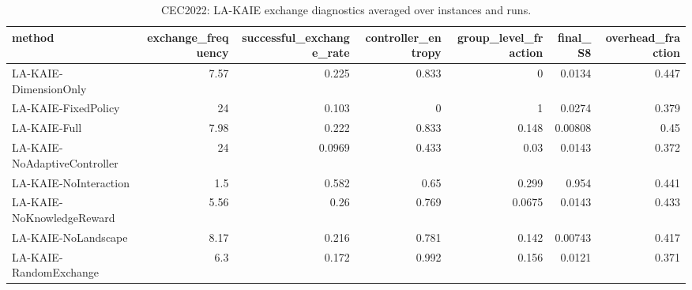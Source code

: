 \begin{table}[t]
\centering
\scriptsize
\caption{CEC2022: LA-KAIE exchange diagnostics averaged over instances and runs.}
\label{tab:cec2022_exchange}
\begin{tabular}{lrrrrrr}
\toprule
method & exchange\_frequency & successful\_exchange\_rate & controller\_entropy & group\_level\_fraction & final\_S8 & overhead\_fraction \\
\midrule
LA-KAIE-DimensionOnly & 7.57 & 0.225 & 0.833 & 0 & 0.0134 & 0.447 \\
LA-KAIE-FixedPolicy & 24 & 0.103 & 0 & 1 & 0.0274 & 0.379 \\
LA-KAIE-Full & 7.98 & 0.222 & 0.833 & 0.148 & 0.00808 & 0.45 \\
LA-KAIE-NoAdaptiveController & 24 & 0.0969 & 0.433 & 0.03 & 0.0143 & 0.372 \\
LA-KAIE-NoInteraction & 1.5 & 0.582 & 0.65 & 0.299 & 0.954 & 0.441 \\
LA-KAIE-NoKnowledgeReward & 5.56 & 0.26 & 0.769 & 0.0675 & 0.0143 & 0.433 \\
LA-KAIE-NoLandscape & 8.17 & 0.216 & 0.781 & 0.142 & 0.00743 & 0.417 \\
LA-KAIE-RandomExchange & 6.3 & 0.172 & 0.992 & 0.156 & 0.0121 & 0.371 \\
\bottomrule
\end{tabular}
\end{table}
